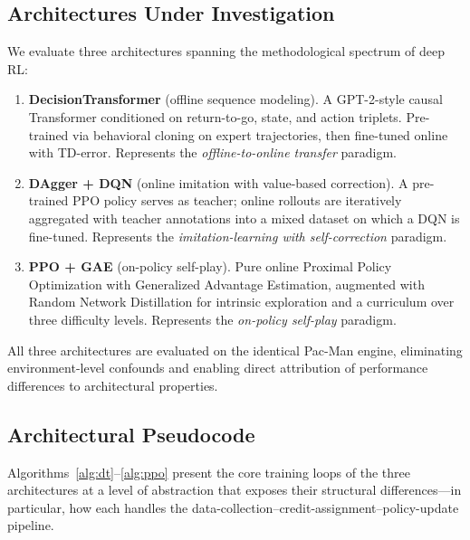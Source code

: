 \documentclass[11pt,a4paper]{article}
\theoremstyle{definition}
\begin{document}
\subsection{Architectures Under Investigation}

We evaluate three architectures spanning the methodological spectrum of deep RL:

\begin{enumerate}[nosep]
    \item \textbf{DecisionTransformer} (offline sequence modeling). A GPT-2-style causal Transformer conditioned on return-to-go, state, and action triplets. Pre-trained via behavioral cloning on expert trajectories, then fine-tuned online with TD-error. Represents the \textit{offline-to-online transfer} paradigm.
    \item \textbf{DAgger + DQN} (online imitation with value-based correction). A pre-trained PPO policy serves as teacher; online rollouts are iteratively aggregated with teacher annotations into a mixed dataset on which a DQN is fine-tuned. Represents the \textit{imitation-learning with self-correction} paradigm.
    \item \textbf{PPO + GAE} (on-policy self-play). Pure online Proximal Policy Optimization with Generalized Advantage Estimation, augmented with Random Network Distillation for intrinsic exploration and a curriculum over three difficulty levels. Represents the \textit{on-policy self-play} paradigm.
\end{enumerate}

All three architectures are evaluated on the identical Pac-Man engine, eliminating environment-level confounds and enabling direct attribution of performance differences to architectural properties.

\subsection{Architectural Pseudocode}

Algorithms~\ref{alg:dt}--\ref{alg:ppo} present the core training loops of the three architectures at a level of abstraction that exposes their structural differences---in particular, how each handles the data-collection--credit-assignment--policy-update pipeline.
\end{document}
